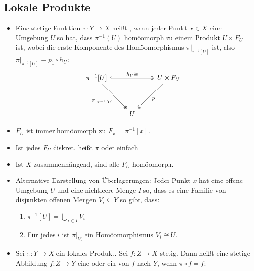 \documentclass[8pt]{extarticle}
\begin{document}
\subsection*{Lokale Produkte}
\begin{itemize}
	\item Eine stetige Funktion $\pi : Y \to X$ heißt , wenn jeder Punkt $x \in X$ eine Umgebung $U$ so hat, dass $\pi^{-1}(U)$ homöomorph zu einem Produkt $U \times F_U$ ist, wobei die erste Komponente des Homöomorphismus $\pi|_{\pi^{-1}[U]}$ ist, also $\pi|_{\pi^{-1}[U]} = p_1 \circ h_U$:
	\[\begin{tikzcd}
		{\pi^{-1}[U]} && {U \times F_U} \\
		\\
		& U
		\arrow["{h_U \cong}", hook, two heads, from=1-1, to=1-3]
		\arrow["{\pi|_{\pi^{-1}[U]}}"', two heads, from=1-1, to=3-2]
		\arrow["{p_1}", two heads, from=1-3, to=3-2]
	\end{tikzcd}\]
	\item $F_U$ ist immer homöomorph zu $F_x = \pi^{-1}[x]$.
	\item Ist jedes $F_U$ diskret, heißt $\pi$  oder einfach .
	\item Ist $X$ zusammenhängend, sind alle $F_U$ homöomorph.
	\item Alternative Darstellung von Überlagerungen: Jeder Punkt $x$ hat eine offene Umgebung $U$ und eine nichtleere Menge $I$ so, dass es eine Familie von disjunkten offenen Mengen $V_i \subseteq Y$ so gibt, dass:
	\begin{enumerate}
		\item $\pi^{-1}[U] = \bigcup_{i \in I} V_i$
		\item Für jedes $i$ ist $\pi|_{V_i}$ ein Homöomorphismus $V_i \cong U$.
	\end{enumerate}
	\item Sei $\pi : Y \to X$ ein lokales Produkt. Sei $f : Z \to X$ stetig. Dann heißt eine stetige Abbildung $\tilde f : Z \to Y$ eine  oder ein  von $f$ nach $Y$, wenn $\pi \circ \tilde f = f$:

\end{itemize}
\end{document}
